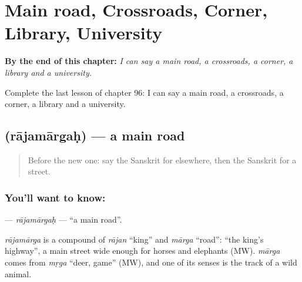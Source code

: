 
\chapter{Main road, Crossroads, Corner, Library, University}
\label{ch:sa-main-road-crossroads-corner-library-university}

\begin{chapteropening}
\textbf{By the end of this chapter:} \emph{I can say a main road, a crossroads, a corner, a library and a university.}

Complete the last lesson of chapter 96: I can say a main road, a crossroads, a corner, a library and a university.
\end{chapteropening}

\section[\texorpdfstring{\sk{राजमार्गः} (rājamārgaḥ)}{राजमार्गः (rājamārgaḥ)}]{ (rājamārgaḥ) — a main road}

\label{lesson:SA-C96-rajamargah}



\begin{quote}
Before the new one: say the Sanskrit for elsewhere, then the Sanskrit for a street.
\end{quote}

\subsection*{You'll want to know: }
\textbf{} — \emph{rājamārgaḥ} — \textquotedblleft{}a main road\textquotedblright{}.

\begin{cousinweb}
\emph{rājamārga} is a compound of \emph{rājan} \textquotedblleft{}king\textquotedblright{} and \emph{mārga} \textquotedblleft{}road\textquotedblright{}: \textquotedblleft{}the king's highway\textquotedblright{}, a main street wide enough for horses and elephants (MW). \emph{mārga} comes from \emph{mṛga} \textquotedblleft{}deer, game\textquotedblright{} (MW), and one of its senses is the track of a wild animal.
\end{cousinweb}


